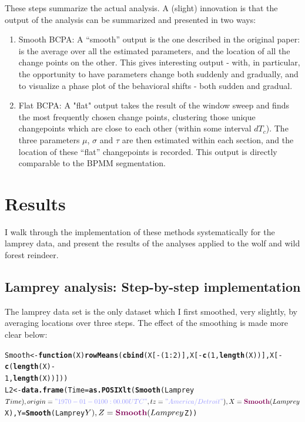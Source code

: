 \documentclass[10pt]{article}\usepackage{graphicx, color}
\makeatletter
\newcommand{\hlfunctioncall}[1]{\textcolor[rgb]{0.501960784313725,0,0.329411764705882}{\textbf{#1}}}%
\newcommand{\hlstring}[1]{\textcolor[rgb]{0.6,0.6,1}{#1}}%
\newenvironment{kframe}{%
 \def\at@end@of@kframe{}%
 \ifinner\ifhmode%
  \def\at@end@of@kframe{\end{minipage}}%
  \begin{minipage}{\columnwidth}%
 \fi\fi%
 \def\FrameCommand##1{\hskip\@totalleftmargin \hskip-\fboxsep
 \colorbox{shadecolor}{##1}\hskip-\fboxsep
     \hskip-\linewidth \hskip-\@totalleftmargin \hskip\columnwidth}%
 \MakeFramed {\advance\hsize-\width
   \@totalleftmargin\z@ \linewidth\hsize
   \@setminipage}}%
 {\par\unskip\endMakeFramed%
 \at@end@of@kframe}
\newenvironment{knitrout}{}{} %
\newcommand{\ben}{\begin{enumerate}}
\newcommand{\een}{\end{enumerate}}
\newcommand{\I}{\item}
\makeatother
\begin{document}
These steps summarize the actual analysis.  A (slight) innovation is that the output of the analysis can be summarized and presented in two ways: 
 
\ben
\I Smooth BCPA: A ``smooth'' output is the one described in the original paper: is the average over all the estimated parameters, and the location of all the change points on the other.  This gives interesting output - with, in particular, the opportunity to have parameters change both suddenly and gradually, and to visualize a phase plot of the behavioral shifts - both sudden and gradual. 

\I Flat BCPA: A "flat" output takes the result of the window sweep and finds the most frequently chosen change points, clustering those unique changepoints which are close to each other (within some interval $dT_c$).  The three parameters $\mu$, $\sigma$ and $\tau$ are then estimated within each section, and the location of these ``flat'' changepoints is recorded.  This output is directly comparable to the BPMM segmentation. 
\een

\section{Results}

I walk through the implementation of these methods systematically for the lamprey data, and present the results of the analyses applied to the wolf and wild forest reindeer.  

\subsection{Lamprey analysis: Step-by-step implementation}

The lamprey data set is the only dataset which I first smoothed, very slightly, by averaging locations over three steps. The effect of the smoothing is made more clear below:

\begin{knitrout}
\color{fgcolor}\begin{kframe}
\begin{alltt}
Smooth <- \hlfunctioncall{function}(X) \hlfunctioncall{rowMeans}(\hlfunctioncall{cbind}(X[-(1:2)], X[-\hlfunctioncall{c}(1, \hlfunctioncall{length}(X))], X[-\hlfunctioncall{c}(\hlfunctioncall{length}(X) - 
    1, \hlfunctioncall{length}(X))]))
L2 <- \hlfunctioncall{data.frame}(Time = \hlfunctioncall{as.POSIXlt}(\hlfunctioncall{Smooth}(Lamprey$Time), origin = \hlstring{"1970-01-01 00:00.00 UTC"}, 
    tz = \hlstring{"America/Detroit"}), X = \hlfunctioncall{Smooth}(Lamprey$X), Y = \hlfunctioncall{Smooth}(Lamprey$Y), Z = \hlfunctioncall{Smooth}(Lamprey$Z))
\end{alltt}
\end{kframe}
\end{knitrout}
\end{document}

